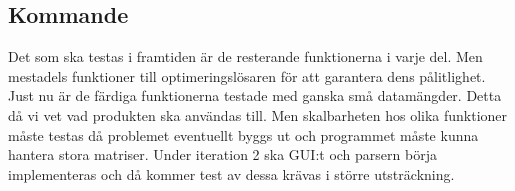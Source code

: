 \subsection{Kommande}
Det som ska testas i framtiden är de resterande funktionerna i varje del. Men mestadels funktioner till optimeringslösaren för att garantera dens pålitlighet. Just nu är de färdiga funktionerna testade med ganska små datamängder. Detta då vi vet vad produkten ska användas till. Men skalbarheten hos olika funktioner måste testas då problemet eventuellt byggs ut och programmet måste kunna hantera stora matriser. Under iteration 2 ska GUI:t och parsern börja implementeras och då kommer test av dessa krävas i större utsträckning.